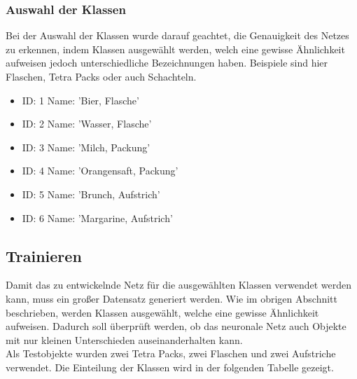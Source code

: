 \documentclass[a4paper,12pt,oneside]{article}
\begin{document}
  \subsubsection{Auswahl der Klassen} 
Bei der Auswahl der Klassen wurde darauf geachtet, die Genauigkeit des Netzes zu erkennen, indem Klassen ausgewählt werden, welch eine gewisse Ähnlichkeit aufweisen jedoch unterschiedliche Bezeichnungen haben. Beispiele sind hier Flaschen, Tetra Packs oder auch Schachteln.

  \vspace{0.5 cm}

  \begin{itemize}
  
  \item ID: 1 Name: 'Bier, Flasche'

  \item ID: 2 Name: 'Wasser, Flasche'

  \item ID: 3 Name: 'Milch, Packung'

  \item ID: 4 Name: 'Orangensaft, Packung'

  \item ID: 5 Name: 'Brunch, Aufstrich'

  \item ID: 6 Name: 'Margarine, Aufstrich'
  
  \end{itemize}
    
  
  \newpage
  
  \subsection{Trainieren}
Damit das zu entwickelnde Netz für die ausgewählten Klassen verwendet werden kann, muss ein großer Datensatz generiert werden. Wie im obrigen Abschnitt beschrieben, werden Klassen ausgewählt, welche eine gewisse Ähnlichkeit aufweisen. Dadurch soll überprüft werden, ob das neuronale Netz auch Objekte mit nur kleinen Unterschieden auseinanderhalten kann.\\
Als Testobjekte wurden zwei Tetra Packs, zwei Flaschen und zwei Aufstriche verwendet. Die Einteilung der Klassen wird in der folgenden Tabelle gezeigt.
\\
\\
\end{document}
